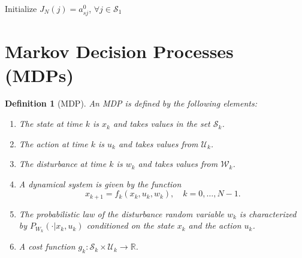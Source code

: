 \documentclass[a4 paper]{article}
\numberwithin{equation}{section}
\theoremstyle{boldStyle}
\theoremstyle{boldBlueStyle}
\theoremstyle{boldPurpleStyle}
\theoremstyle{boldRedStyle}
\newtheorem{definition}{Definition}[section]
\theoremstyle{boldGreenStyle}
\begin{document}
\begin{algorithm}[H]
    \SetNoFillComment
    \SetAlgoLined
    Initialize \( J_N(j) = a^0_{sj} \), \( \forall j \in \mathcal{S}_1 \) \;
    \caption{} \label{algo:forward_algorithm_shortest_path}
\end{algorithm}



\newpage
\section{Markov Decision Processes (MDPs)}

\begin{definition}[MDP]
  An MDP is defined by the following elements:
  \begin{enumerate}
    \item The state at time \( k \) is \( x_k \) and takes values in the set \( \mathcal{S}_k \).
    \item The action at time \( k \) is \( u_k \) and takes values from \( \mathcal{U}_k \).
    \item The disturbance at time \( k \) is \( w_k \) and takes values from \( \mathcal{W}_k \).
    \item A dynamical system is given by the function
      \begin{equation}
        x_{k+1} = f_k(x_k, u_k, w_k), \quad k = 0, \ldots, N-1.
      \end{equation}
    \item The probabilistic law of the disturbance random variable \( w_k \) is characterized by \( P_{W_k}(\cdot | x_k, u_k) \) conditioned on the state \( x_k \) and the action \( u_k \).
    \item A cost function \( g_k : \mathcal{S}_k \times \mathcal{U}_k \to \mathbb{R} \).
  \end{enumerate}
\end{definition}
\end{document}
